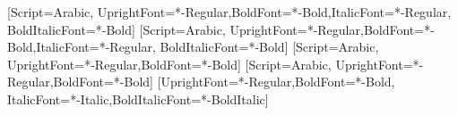 \setmainfont{NotoNaskhArabic}[Script=Arabic,
  UprightFont=*-Regular,BoldFont=*-Bold,ItalicFont=*-Regular,
  BoldItalicFont=*-Bold]
\newfontfamily{}[Script=Arabic,
  UprightFont=*-Regular,BoldFont=*-Bold,ItalicFont=*-Regular,
  BoldItalicFont=*-Bold]
\newfontfamily{}[Script=Arabic,
  UprightFont=*-Regular,BoldFont=*-Bold]
\newfontfamily{}[Script=Arabic,
  UprightFont=*-Regular,BoldFont=*-Bold]
\newfontfamily{}[UprightFont=*-Regular,BoldFont=*-Bold,
  ItalicFont=*-Italic,BoldItalicFont=*-BoldItalic]

\linespread{1.15}
\color{rcText}
\setlength{\parindent}{0pt}
\setlength{\parskip}{4pt} %

\newcommand{\en}[1]{\textenglish{#1}}
\newcommand{\kos}{\en{KayanOS}}
\newcommand{\key}[1]{{\textenglish{\small\textcolor{rcPrimary}{#1}}}}

